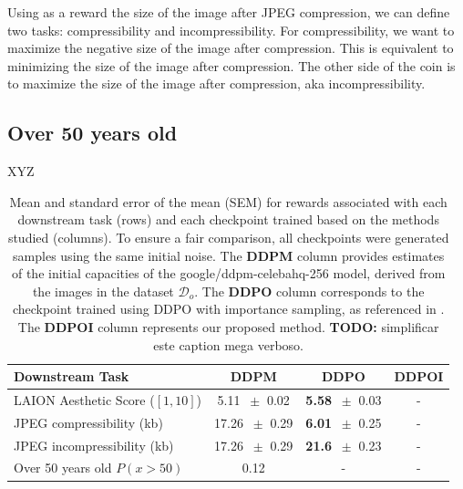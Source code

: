 Using as a reward the size of the image after JPEG compression, we can 
 define two tasks: compressibility and incompressibility. For compressibility,
 we want to maximize the negative size of the image after compression. This
is equivalent to minimizing the size of the image after compression. 
The other side of the coin is to maximize the size of the image after compression, aka incompressibility.
  
 \subsection{Over 50 years old}

 XYZ

\begin{table}
\centering
\begin{tabular}{lccc}
\toprule
\textbf{Downstream Task} & \textbf{DDPM} & \textbf{DDPO} & \textbf{DDPOI}\\
\midrule
LAION Aesthetic Score ($[1,10]$) & 5.11 $~\pm$ 0.02 & \textbf{5.58} $~\pm$ 0.03 & - \\
JPEG compressibility (kb) & 17.26 $~\pm$  0.29 & \textbf{6.01} $~\pm$ 0.25  & -\\
JPEG incompressibility (kb) & 17.26 $~\pm$ 0.29 & \textbf{21.6} $~\pm$ 0.23 & - \\
Over 50 years old $P(x>\text{50})$ & 0.12 & - & - \\
\bottomrule
\end{tabular}
\captionsetup{width=\textwidth} %
\caption{Mean and standard error of the mean (SEM) for rewards associated with each downstream task (rows) and each checkpoint trained based on the methods studied (columns). To ensure a fair comparison, all checkpoints were generated samples using the same initial noise. The \textbf{DDPM} column provides estimates of the initial capacities of the google/ddpm-celebahq-256 model, derived from the images in the dataset $\mathcal{D}_{o}$. The \textbf{DDPO} column corresponds to the checkpoint trained using DDPO with importance sampling, as referenced in \cite{black2023training}. The \textbf{DDPOI} column represents our proposed method. \textbf{TODO:} simplificar este caption mega verboso.}
\end{table}




